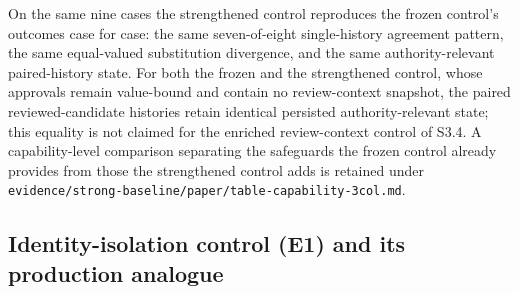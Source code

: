 \documentclass[preprint,12pt,authoryear]{elsarticle}
\newcommand{\code}[1]{\nolinkurl{#1}}
\begin{document}
On the same nine cases the strengthened control reproduces the frozen control's
outcomes case for case: the same seven-of-eight single-history agreement pattern,
the same equal-valued substitution divergence, and the same authority-relevant
paired-history state. For both the frozen and the strengthened control, whose
approvals remain value-bound and contain no review-context snapshot, the paired
reviewed-candidate histories retain identical persisted authority-relevant state;
this equality is not claimed for the enriched review-context control of S3.4. A
capability-level comparison separating the safeguards the frozen control already
provides from those the strengthened control adds is retained under
\code{evidence/strong-baseline/paper/table-capability-3col.md}.

\subsection{Identity-isolation control (E1) and its production analogue}
\label{app:identity-isolation}
\end{document}
